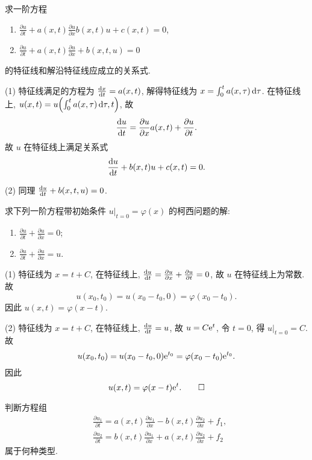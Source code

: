 \begin{exercise}
  求一阶方程
  \begin{enumerate}[(1)]
    \item $\frac{\partial u}{\partial t} + a(x,t) \frac{\partial u}{\partial x} 
      b(x,t)u + c(x,t) = 0$,
    \item $\frac{\partial u}{\partial t} + a(x,t) \frac{\partial u}{\partial x}
      + b(x,t,u) = 0$
  \end{enumerate}
  的特征线和解沿特征线应成立的关系式.
\end{exercise}

\begin{solve}
  (1) 特征线满足的方程为 $\frac{\mathop{}\!\mathrm{d} x}{\mathop{}\!\mathrm{d} t} = a(x,t)$,
  解得特征线为 $x = \int_0^t a(x,\tau) \mathop{}\!\mathrm{d}\tau$.
  在特征线上, $u(x,t) = u\Bigl(\int_0^t a(x, \tau) \mathop{}\!\mathrm{d}\tau, t\Bigr)$, 故
  \[\frac{\mathop{}\!\mathrm{d} u}{\mathop{}\!\mathrm{d} t} = \frac{\partial u}{\partial x} a(x,t)
    + \frac{\partial u}{\partial t}.\]
  故 $u$ 在特征线上满足关系式
  \[\frac{\mathop{}\!\mathrm{d} u}{\mathop{}\!\mathrm{d} t} + b(x,t)u + c(x,t) = 0.\]

  (2) 同理 $\frac{\mathop{}\!\mathrm{d} u}{\mathop{}\!\mathrm{d} t} + b(x,t,u) = 0$.
\end{solve}


\begin{exercise}
  求下列一阶方程带初始条件 $u|_{t=0} = \varphi(x)$ 的柯西问题的解:
  \begin{enumerate}[(1)]
    \item $\frac{\partial u}{\partial t} + \frac{\partial u}{\partial x} = 0$;
    \item $\frac{\partial u}{\partial t} + \frac{\partial u}{\partial x} = u$.
  \end{enumerate}
\end{exercise}

\begin{solve}
  (1) 特征线为 $x = t+C$, 在特征线上, $\frac{\mathop{}\!\mathrm{d} u}{\mathop{}\!\mathrm{d} t} = 
    \frac{\partial u}{\partial x} + \frac{\partial u}{\partial t} = 0$,
  故 $u$ 在特征线上为常数. 故
  \[u(x_0, t_0) = u(x_0-t_0, 0) = \varphi(x_0-t_0).\]
  因此 $u(x,t) = \varphi(x-t)$.

  (2) 特征线为 $x = t+C$, 在特征线上, $\frac{\mathop{}\!\mathrm{d} u}{\mathop{}\!\mathrm{d} t} = u$,
  故 $u = C\mathrm{e}^t$, 令 $t=0$, 得 $u|_{t=0} = C$. 故
  \[u(x_0, t_0) = u(x_0-t_0, 0) \mathrm{e}^{t_0} = \varphi(x_0-t_0)\mathrm{e}^{t_0}.\]
  因此
  \[u(x, t) = \varphi(x-t) \mathrm{e}^t. \qedhere\]
\end{solve}


\begin{exercise}
  判断方程组
  \begin{align*}
    & \frac{\partial u_1}{\partial t} = a(x,t) \frac{\partial u_1}{\partial x}
      - b(x,t) \frac{\partial u_2}{\partial x} + f_1, \\
    & \frac{\partial u_2}{\partial t} = b(x,t) \frac{\partial u_1}{\partial x}
      + a(x,t) \frac{\partial u_2}{\partial x} + f_2
  \end{align*}
  属于何种类型.
\end{exercise}


